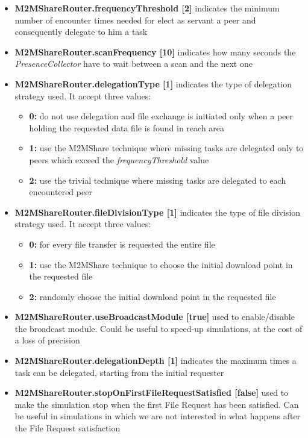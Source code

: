 \begin{itemize}
\item \textbf{M2MShareRouter.frequencyThreshold [2]} indicates the minimum number of encounter times needed for elect as servant a peer and consequently delegate to him a task
\item \textbf{M2MShareRouter.scanFrequency [10]} indicates how many seconds the \textit{PresenceCollector} have to wait between a scan and the next one
\item \textbf{M2MShareRouter.delegationType [1]} indicates the type of delegation strategy used. It accept three values:
\begin{itemize}
\item \textbf{0:} do not use delegation and file exchange is initiated only when a peer holding the requested data file is found in reach area 
\item \textbf{1:} use the M2MShare technique where missing tasks are delegated only to peers which exceed the \textit{frequencyThreshold} value
\item \textbf{2:} use the trivial technique where missing tasks are delegated to each encountered peer
\end{itemize}
\item \textbf{M2MShareRouter.fileDivisionType [1]} indicates the type of file division strategy used. It accept three values:
\begin{itemize}
\item \textbf{0:} for every file transfer is requested the entire file
\item \textbf{1:} use the M2MShare technique to choose the initial download point in the requested file
\item \textbf{2:} randomly choose the initial download point in the requested file
\end{itemize}
\item \textbf{M2MShareRouter.useBroadcastModule [true]} used to enable/disable the broadcast module. Could be useful to speed-up simulations, at the cost of a loss of precision
\item \textbf{M2MShareRouter.delegationDepth [1]} indicates the maximum times a task can be delegated, starting from the initial requester
\item \textbf{M2MShareRouter.stopOnFirstFileRequestSatisfied [false]} used to make the simulation stop when the first File Request has been satisfied. Can be useful in simulations in which we are not interested in what happens after the File Request satisfaction
\end{itemize}

